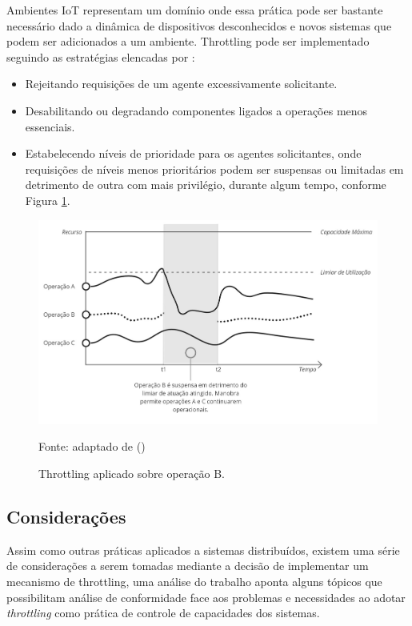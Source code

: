 Ambientes IoT representam um domínio onde essa prática pode ser bastante necessário dado a dinâmica de dispositivos desconhecidos e novos sistemas que podem ser adicionados a um ambiente. Throttling pode ser implementado seguindo as estratégias elencadas por :

\begin{itemize}
	\item Rejeitando requisições de um agente excessivamente solicitante.
	\item Desabilitando ou degradando componentes ligados a operações menos essenciais. 
	\item Estabelecendo níveis de prioridade para os agentes solicitantes, onde requisições de níveis menos prioritários podem ser suspensas ou limitadas em detrimento de outra com mais privilégio, durante algum tempo, conforme Figura \ref{fig:cap2throttlingexample}.
\end{itemize}

\begin{figure}[H]
	\centering
	\caption{Throttling aplicado sobre operação B.}
	\label{fig:cap2throttlingexample}
	\includegraphics[width=0.8\linewidth]{Imagens/cap2/cap2throttlingexample}	
	
	Fonte: adaptado de \citeauthor{martinekuan_throttling_nodate} (\citeyear{martinekuan_throttling_nodate})
\end{figure}

\subsection{Considerações}
Assim como outras práticas aplicados a sistemas distribuídos, existem uma série de considerações a serem tomadas mediante a decisão de implementar um mecanismo de throttling, uma análise do trabalho \cite{martinekuan_throttling_nodate} aponta alguns tópicos que possibilitam análise de conformidade face aos problemas e necessidades ao adotar \textit{throttling} como prática de controle de capacidades dos sistemas.  

